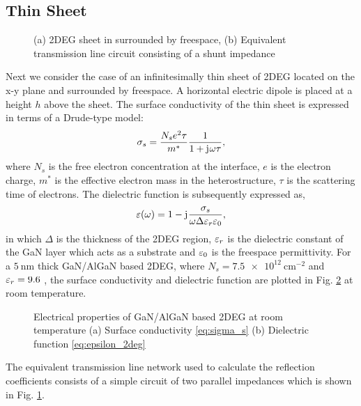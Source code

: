 \documentclass[12pt]{article}
\begin{document}
\subsection{Thin Sheet}
%
\begin{figure}[t!]
  \centering
  \def\svgwidth{.5\linewidth}
  
  \caption{(a) 2DEG sheet in surrounded by freespace, (b) Equivalent transmission line circuit consisting of a shunt impedance}
  \label{fig:2deg_TL_equivalent}
\end{figure}
%
Next we consider the case of an infinitesimally thin sheet of 2DEG located on the x-y plane and surrounded by freespace. A horizontal electric dipole is placed at a height $h$ above the sheet. The surface conductivity of the thin sheet is expressed in terms of a Drude-type model:
%
\begin{equation}
  \sigma_s = \frac{N_s e^2 \tau}{m^{\ast}}\frac{1}{1 + \mathrm{j}\mkern1mu \omega \tau},
  \label{eq:sigma_s}
\end{equation}
%
where $N_s$ is the free electron concentration at the interface, $e$ is the electron charge, $m^{\ast}$ is the effective electron mass in the heterostructure, $\tau$ is the scattering time of electrons. The dielectric function is subsequently expressed as,
%
\begin{equation}
  \varepsilon(\omega) =  1 - \mathrm{j}\mkern1mu \frac{\sigma_s}{\omega \Delta \varepsilon_r \varepsilon_0},
  \label{eq:epsilon_2deg}
\end{equation}
%
in which $\Delta$ is the thickness of the 2DEG region, $\varepsilon_r$ is the dielectric constant of the GaN layer which acts as a substrate and $\varepsilon_0$ is the freespace permittivity. For a $\SI{5}{\nm}$ thick GaN/AlGaN based 2DEG, where $N_s = \SI[round-precision=2]{7.5e12}{\cm^{-2}}$ and $\varepsilon_r = 9.6$ \cite{Muravjov2010}, the surface conductivity and dielectric function are plotted in Fig. \ref{fig:Electric_properties_2DEG} at room temperature.
%
\begin{figure}[!htbp]
  \centering
  \caption{Electrical properties of GaN/AlGaN based 2DEG at room temperature (a) Surface conductivity \eqref{eq:sigma_s} (b) Dielectric function \eqref{eq:epsilon_2deg}}
  \label{fig:Electric_properties_2DEG}
\end{figure}
%
The equivalent transmission line network used to calculate the reflection coefficients consists of a simple circuit of two parallel impedances \cite{Hanson2008,Lovat2012,Gomez-Diaz2013} which is shown in Fig. \ref{fig:2deg_TL_equivalent}.
\end{document}

